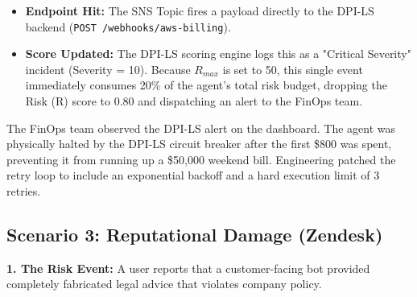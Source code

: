 \documentclass[11pt,a4paper]{article}
\begin{document}
\vspace{0.3cm}
\begin{tcolorbox}[enhanced, colback=blue!5!white, colframe=dpiblue, title={\textbf{\faCogs\ 4. Integration \& Score Downgrade}}, fonttitle=\bfseries, boxrule=1pt, arc=2mm]
\begin{itemize}
    \item \textbf{Endpoint Hit:} The SNS Topic fires a payload directly to the DPI-LS backend (\texttt{POST /webhooks/aws-billing}).
    \item \textbf{Score Updated:} The DPI-LS scoring engine logs this as a "Critical Severity" incident (Severity = 10). Because $R_{max}$ is set to 50, this single event immediately consumes 20\% of the agent's total risk budget, dropping the Risk (R) score to 0.80 and dispatching an alert to the FinOps team.
\end{itemize}
\end{tcolorbox}
\vspace{0.3cm}


\vspace{0.3cm}
\begin{tcolorbox}[enhanced, colback=green!5!white, colframe=dpigreen, title={\textbf{\faWrench\ 6. Root Cause Analysis \& Resolution}}, fonttitle=\bfseries, boxrule=1pt, arc=2mm]
The FinOps team observed the DPI-LS alert on the dashboard. The agent was physically halted by the DPI-LS circuit breaker after the first \$800 was spent, preventing it from running up a \$50,000 weekend bill. Engineering patched the retry loop to include an exponential backoff and a hard execution limit of 3 retries.
\end{tcolorbox}
\vspace{0.3cm}

\subsection{Scenario 3: Reputational Damage (Zendesk)}

\textbf{1. The Risk Event:} 
A user reports that a customer-facing bot provided completely fabricated legal advice that violates company policy.
\end{document}
